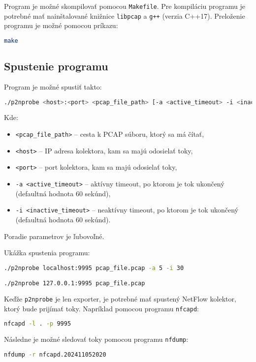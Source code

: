 \documentclass[a4paper, 12pt]{article}
\begin{document}
Program je možné skompilovať pomocou \texttt{Makefile}. Pre kompiláciu programu je potrebné mať nainštalované knižnice \texttt{libpcap} a \texttt{g++} (verzia C++17). Preloženie programu je možné pomocou príkazu:
\begin{lstlisting}[language=bash]
make
\end{lstlisting}

\subsection{Spustenie programu}

Program je možné spustiť takto:
\begin{lstlisting}[language=bash]
./p2nprobe <host>:<port> <pcap_file_path> [-a <active_timeout> -i <inactive_timeout>]
\end{lstlisting}

Kde:

\begin{itemize}
    \item \texttt{<pcap\_file\_path>} -- cesta k PCAP súboru, ktorý sa má čítať,
    \item \texttt{<host>} -- IP adresa kolektora, kam sa majú odosielať toky,
    \item \texttt{<port>} -- port kolektora, kam sa majú odosielať toky,
    \item \texttt{-a <active\_timeout>} -- aktívny timeout, po ktorom je tok ukončený (defaultná hodnota 60 sekúnd),
    \item \texttt{-i <inactive\_timeout>} -- neaktívny timeout, po ktorom je tok ukončený (defaultná hodnota 60 sekúnd).
\end{itemize}

Poradie parametrov je ľubovoľné.

Ukážka spustenia programu:
\begin{lstlisting}[language=bash]
./p2nprobe localhost:9995 pcap_file.pcap -a 5 -i 30

./p2nprobe 127.0.0.1:9995 pcap_file.pcap
\end{lstlisting}

Keďže \texttt{p2nprobe} je len exporter, je potrebné mať spustený NetFlow kolektor, ktorý bude prijímať toky. Napríklad pomocou programu \texttt{nfcapd}:
\begin{lstlisting}[language=bash]
nfcapd -l . -p 9995
\end{lstlisting}

Následne je možné sledovať toky pomocou programu \texttt{nfdump}:
\begin{lstlisting}[language=bash]
nfdump -r nfcapd.202411052020
\end{lstlisting}
\end{document}
